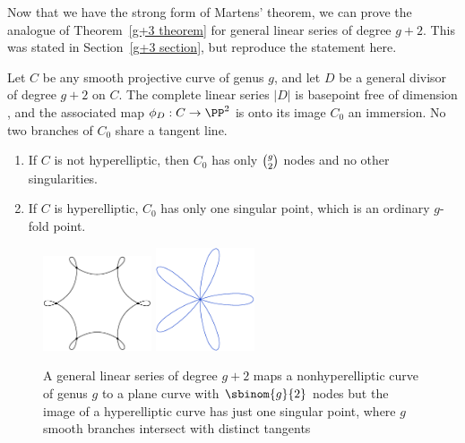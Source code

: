 Now that we have the strong form of Martens' theorem, we can prove the
analogue of Theorem~\ref{g+3 theorem} for general linear series of degree
$g+2$. This was stated in Section~\ref{g+3 section}, but 
reproduce
the statement here.
%

\begin{theorem}\label{needed for nodes}
Let $C$ be any smooth projective curve of genus $g$, and let $D$ be a
general divisor of degree $g+2$ on $C$.
The complete linear series $|D|$ is basepoint free of dimension \2,
and the associated map $\phi_D: C\to \PP^2$
 is 
% 
onto its image $C_0$ 
an immersion.
No two branches of $C_0$ share a tangent line. 

\begin{enumerate}
\item If $C$ is not hyperelliptic, then $C_0$ has only $\tbinom{g}{2}$
nodes and no other singularities. 
\item If $C$ is hyperelliptic,  
$C_0$ has only one singular point,
  which is an ordinary $g$-fold point.
\end{enumerate}
\end{theorem}


\begin{figure}
\leavevmode{}\hbox{\includegraphics[height=1.1in]{main/Fig09-4A}}
\qquad
\includegraphics[height=1.2in]{main/five}
\caption{A general linear series of degree $g+2$ maps a nonhyperelliptic
curve of genus $g$
to a plane curve with $\protect\sbinom{g}{2}$ nodes
but the image of a
hyperelliptic curve has
just one singular point, where $g$ smooth branches intersect with
distinct tangents
}
\label{Fig9.4}
\end{figure}

